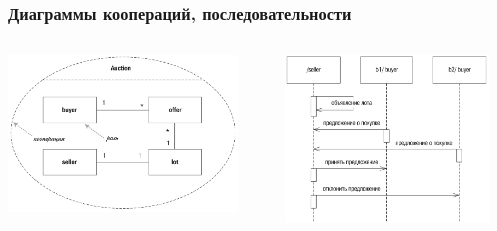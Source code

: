\documentclass{../../slides-style}
\begin{document}
    \begin{frame}
        \frametitle{Диаграммы коопераций, последовательности}
        \begin{columns}
            \begin{column}{0.5\textwidth}
                \begin{center}
                    \includegraphics[width=0.9\textwidth]{cooperationDiagram.png}
                \end{center}
            \end{column}
            \begin{column}{0.5\textwidth}
                \begin{center}
                    \includegraphics[width=0.9\textwidth]{cooperationSequenceDiagram.png}
                \end{center}
            \end{column}
        \end{columns}
    \end{frame}
\end{document}
